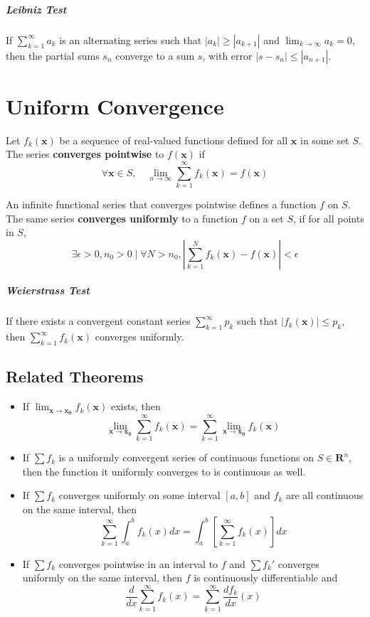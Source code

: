 \documentclass[11pt]{article}
\begin{document}
	\subparagraph{Leibniz Test} If $\sum_{k=1}^\infty a_k$ is an alternating series such that $|a_k| \geq |a_{k+1}|$ and $\lim_{k\rightarrow \infty} a_k = 0$, then the partial sums $s_n$ converge to a sum $s$, with error $|s - s_n| \leq |a_{n+1}|$.
	
\section{Uniform Convergence}
	Let $f_k(\mathbf{x})$ be a sequence of real-valued functions defined for all $\mathbf{x}$ in some set $S$. The series \textbf{converges pointwise} to $f(\mathbf{x})$ if
	\begin{equation}
		\forall \mathbf{x} \in S, \quad \lim_{n\rightarrow \infty} \sum_{k=1}^\infty f_k(\mathbf{x}) = f(\mathbf{x})
	\end{equation}
	
	An infinite functional series that converges pointwise defines a function $f$ on $S$. The same series \textbf{converges uniformly} to a function $f$ on a set $S$, if for all points in $S$,
	\begin{equation}
		\exists \epsilon > 0, n_0 > 0 \mid \forall N > n_0, \left| \sum_{k=1}^N f_k(\mathbf{x}) - f(\mathbf{x}) \right| < \epsilon
	\end{equation}
	
	\subparagraph{Weierstrass Test} If there exists a convergent constant series $\sum_{k=1}^\infty p_k$ such that $|f_k(\mathbf{x})| \leq p_k$, then $\sum_{k=1}^\infty f_k(\mathbf{x})$ converges uniformly.
	
	\subsection{Related Theorems}
		\begin{itemize}
			\item If $\lim_{\mathbf{x} \rightarrow \mathbf{x_0}} f_k(\mathbf{x})$ exists, then
				\begin{equation}
					\lim_{\mathbf{x} \rightarrow \mathbf{x_0}} \sum_{k=1}^\infty f_k(\mathbf{x}) = \sum_{k=1}^\infty \lim_{\mathbf{x} \rightarrow \mathbf{x_0}} f_k(\mathbf{x})
				\end{equation}
			\item If $\sum f_k$ is a uniformly convergent series of continuous functions on $S \in \mathbf{R}^n$, then the function it uniformly converges to is continuous as well.
			\item If $\sum f_k$ converges uniformly on some interval $[a, b]$ and $f_k$ are all continuous on the same interval, then
			\begin{equation}
				\sum_{k=1}^\infty \int_a^b f_k(x)dx = \int_a^b \left[ \sum_{k=1}^\infty f_k(x) \right] dx
			\end{equation}
			\item If $\sum f_k$ converges pointwise in an interval to $f$ and $\sum f_k'$ converges uniformly on the same interval, then $f$ is continuously differentiable and
			\begin{equation}
				\frac{d}{dx} \sum_{k=1}^\infty f_k(x) = \sum_{k=1}^\infty \frac{df_k}{dx}(x)
			\end{equation}
		\end{itemize}
		
\end{document}
